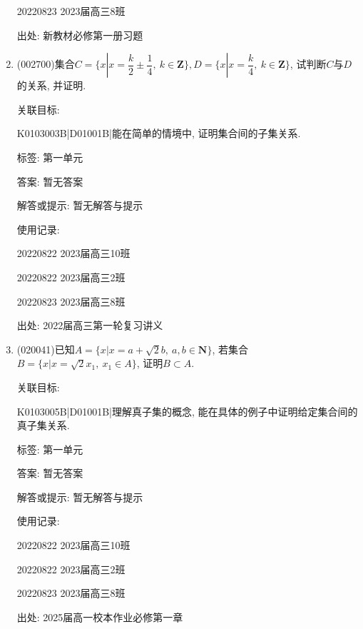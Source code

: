 \documentclass[10pt,a4paper]{article}
\begin{document}
\begin{enumerate}[1.]
20220823	2023届高三8班	


出处: 新教材必修第一册习题
\item { (002700)}集合$C=\{x|x=\dfrac k2\pm \dfrac14, \ k\in \mathbf{Z}\},D=\{x|x=\dfrac k4,\ k\in \mathbf{Z}\}$, 试判断$C$与$D$的关系, 并证明.


关联目标:

K0103003B|D01001B|能在简单的情境中, 证明集合间的子集关系.



标签: 第一单元

答案: 暂无答案

解答或提示: 暂无解答与提示

使用记录:

20220822	2023届高三10班	

20220822	2023届高三2班	

20220823	2023届高三8班	


出处: 2022届高三第一轮复习讲义
\item { (020041)}已知$A=\{x|x=a+\sqrt 2b,\ a,b\in \mathbf{N}\}$, 若集合$B=\{x|x=\sqrt 2x_1,\  x_1 \in A\}$, 证明$B\subset A$.


关联目标:

K0103005B|D01001B|理解真子集的概念, 能在具体的例子中证明给定集合间的真子集关系.



标签: 第一单元

答案: 暂无答案

解答或提示: 暂无解答与提示

使用记录:

20220822	2023届高三10班	

20220822	2023届高三2班	

20220823	2023届高三8班	


出处: 2025届高一校本作业必修第一章
\end{enumerate}
\end{document}
